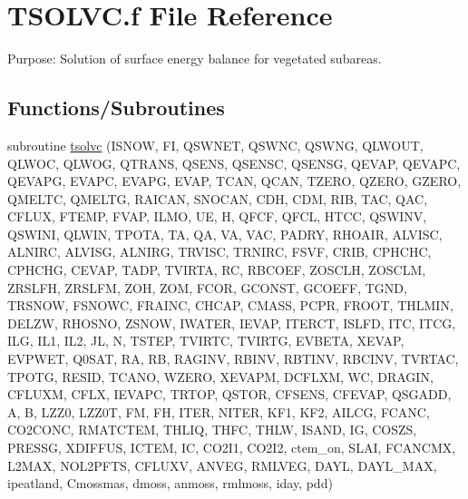 \hypertarget{TSOLVC_8f}{}\section{T\+S\+O\+L\+V\+C.\+f File Reference}
\label{TSOLVC_8f}


Purpose\+: Solution of surface energy balance for vegetated subareas.  


\subsection*{Functions/\+Subroutines}
\begin{DoxyCompactItemize}
\item 
subroutine \hyperlink{TSOLVC_8f_a824dab26436ace6ad8f0f9e2f6908ce2}{tsolvc} (I\+S\+N\+O\+W, F\+I, Q\+S\+W\+N\+E\+T, Q\+S\+W\+N\+C, Q\+S\+W\+N\+G, Q\+L\+W\+O\+U\+T, Q\+L\+W\+O\+C, Q\+L\+W\+O\+G, Q\+T\+R\+A\+N\+S, Q\+S\+E\+N\+S, Q\+S\+E\+N\+S\+C, Q\+S\+E\+N\+S\+G, Q\+E\+V\+A\+P, Q\+E\+V\+A\+P\+C, Q\+E\+V\+A\+P\+G, E\+V\+A\+P\+C, E\+V\+A\+P\+G, E\+V\+A\+P, T\+C\+A\+N, Q\+C\+A\+N, T\+Z\+E\+R\+O, Q\+Z\+E\+R\+O, G\+Z\+E\+R\+O, Q\+M\+E\+L\+T\+C, Q\+M\+E\+L\+T\+G, R\+A\+I\+C\+A\+N, S\+N\+O\+C\+A\+N, C\+D\+H, C\+D\+M, R\+I\+B, T\+A\+C, Q\+A\+C, C\+F\+L\+U\+X, F\+T\+E\+M\+P, F\+V\+A\+P, I\+L\+M\+O, U\+E, H, Q\+F\+C\+F, Q\+F\+C\+L, H\+T\+C\+C, Q\+S\+W\+I\+N\+V, Q\+S\+W\+I\+N\+I, Q\+L\+W\+I\+N, T\+P\+O\+T\+A, T\+A, Q\+A, V\+A, V\+A\+C, P\+A\+D\+R\+Y, R\+H\+O\+A\+I\+R, A\+L\+V\+I\+S\+C, A\+L\+N\+I\+R\+C, A\+L\+V\+I\+S\+G, A\+L\+N\+I\+R\+G, T\+R\+V\+I\+S\+C, T\+R\+N\+I\+R\+C, F\+S\+V\+F, C\+R\+I\+B, C\+P\+H\+C\+H\+C, C\+P\+H\+C\+H\+G, C\+E\+V\+A\+P, T\+A\+D\+P, T\+V\+I\+R\+T\+A, R\+C, R\+B\+C\+O\+E\+F, Z\+O\+S\+C\+L\+H, Z\+O\+S\+C\+L\+M, Z\+R\+S\+L\+F\+H, Z\+R\+S\+L\+F\+M, Z\+O\+H, Z\+O\+M, F\+C\+O\+R, G\+C\+O\+N\+S\+T, G\+C\+O\+E\+F\+F, T\+G\+N\+D, T\+R\+S\+N\+O\+W, F\+S\+N\+O\+W\+C, F\+R\+A\+I\+N\+C, C\+H\+C\+A\+P, C\+M\+A\+S\+S, P\+C\+P\+R, F\+R\+O\+O\+T, T\+H\+L\+M\+I\+N, D\+E\+L\+Z\+W, R\+H\+O\+S\+N\+O, Z\+S\+N\+O\+W, I\+W\+A\+T\+E\+R, I\+E\+V\+A\+P, I\+T\+E\+R\+C\+T, I\+S\+L\+F\+D, I\+T\+C, I\+T\+C\+G, I\+L\+G, I\+L1, I\+L2, J\+L, N, T\+S\+T\+E\+P, T\+V\+I\+R\+T\+C, T\+V\+I\+R\+T\+G, E\+V\+B\+E\+T\+A, X\+E\+V\+A\+P, E\+V\+P\+W\+E\+T, Q0\+S\+A\+T, R\+A, R\+B, R\+A\+G\+I\+N\+V, R\+B\+I\+N\+V, R\+B\+T\+I\+N\+V, R\+B\+C\+I\+N\+V, T\+V\+R\+T\+A\+C, T\+P\+O\+T\+G, R\+E\+S\+I\+D, T\+C\+A\+N\+O, W\+Z\+E\+R\+O, X\+E\+V\+A\+P\+M, D\+C\+F\+L\+X\+M, W\+C, D\+R\+A\+G\+I\+N, C\+F\+L\+U\+X\+M, C\+F\+L\+X, I\+E\+V\+A\+P\+C, T\+R\+T\+O\+P, Q\+S\+T\+O\+R, C\+F\+S\+E\+N\+S, C\+F\+E\+V\+A\+P, Q\+S\+G\+A\+D\+D, A, B, L\+Z\+Z0, L\+Z\+Z0\+T, F\+M, F\+H, I\+T\+E\+R, N\+I\+T\+E\+R, K\+F1, K\+F2, A\+I\+L\+C\+G, F\+C\+A\+N\+C, C\+O2\+C\+O\+N\+C, R\+M\+A\+T\+C\+T\+E\+M, T\+H\+L\+I\+Q, T\+H\+F\+C, T\+H\+L\+W, I\+S\+A\+N\+D, I\+G, C\+O\+S\+Z\+S, P\+R\+E\+S\+S\+G, X\+D\+I\+F\+F\+U\+S, I\+C\+T\+E\+M, I\+C, C\+O2\+I1, C\+O2\+I2, ctem\+\_\+on, S\+L\+A\+I, F\+C\+A\+N\+C\+M\+X, L2\+M\+A\+X, N\+O\+L2\+P\+F\+T\+S, C\+F\+L\+U\+X\+V, A\+N\+V\+E\+G, R\+M\+L\+V\+E\+G, D\+A\+Y\+L, D\+A\+Y\+L\+\_\+\+M\+A\+X, ipeatland, Cmossmas, dmoss, anmoss, rmlmoss, iday, pdd)
\end{DoxyCompactItemize}


